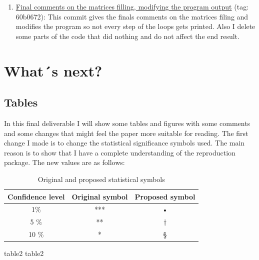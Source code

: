 \documentclass{article}
\begin{document}
\begin{itemize}
\begin{enumerate}[label=\roman*,resume]
                \item \href{https://github.com/jorgeluis8ar/Revised-reproduction-package-for-Abebe-et-al-2021/commit/60b06721ee8e688e123f523b3c04092f99dadd1b}{Final comments on the matrices filling, modifying the program output} (tag: 60b0672): This commit gives the finals comments on the matrices filing and modifies the program so not every step of the loops gets printed. Also I delete some parts of the code that did nothing and do not affect the end result.
                
                
            \end{enumerate}
    \end{itemize}


\section{What´s next?} \label{What´s next?}
\subsection{Tables}
In this final deliverable I will show some tables and figures with some comments and some changes that might feel the paper more suitable for reading. The first change I made is to change the statistical significance symbols used. The main reason is to show that I have a complete understanding of the reproduction package. The new values are as follows:

\medskip

\begin{table}[h!]
    \centering
    \caption{Original and proposed statistical symbols}
    \begin{tabular}{|c|c|c|}
    \hline
      \textbf{Confidence level} & \textbf{Original symbol} & \textbf{Proposed symbol}\\
    \hline
        1\%   & *** & • \\
    \hline
         5 \% &  ** & † \\
    \hline
        10 \% &  *  & § \\    
    \hline
    \end{tabular}
    \label{tab:my_label}
\end{table}



{table2}\label{tab:FD table 2 o}
{table2}\label{tab:FD table 2 p}
\end{document}
